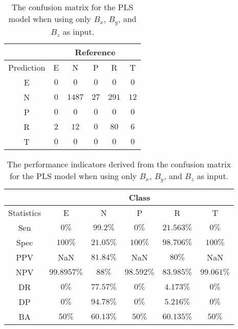 \begin{table}[!ht]
	\centering
	\begin{tabular}{|c|c|c|c|c|c|}
		\hline
		 & \multicolumn{5}{|c|}{Reference} \\ \hline
		 Prediction & E & N & P & R & T \\ \hline
		 E & $0$ & $0$ & $0$ & $0$ & $0$ \\ \hline
		 N & $0$ & $1487$ & $27$ & $291$ & $12$ \\ \hline
		 P & $0$ & $0$ & $0$ & $0$ & $0$ \\ \hline
		 R & $2$ & $12$ & $0$ & $80$ & $6$ \\ \hline
		 T & $0$ & $0$ & $0$ & $0$ & $0$ \\ \hline
	\end{tabular}
	\caption{The confusion matrix for the PLS model when using only $B_{x}$, $B_{y}$, and $B_{z}$ as input.}
	\label{tab:cm:coord:pls}
\end{table}

\begin{table}[!ht]
	\centering
	\begin{tabular}{|c|c|c|c|c|c|}
		\hline
		 & \multicolumn{5}{c|}{Class} \\ \hline
		Statistics & E & N & P & R & T \\ \hline
		Sen & $0\%$ & $99.2\%$ & $0\%$ & $21.563\%$ & $0\%$ \\ \hline
		Spec & $100\%$ & $21.05\%$ & $100\%$ & $98.706\%$ & $100\%$ \\ \hline
		PPV & NaN & $81.84\%$ & NaN & $80\%$ & NaN \\ \hline
		NPV & $99.8957\%$ & $88\%$ & $98.592\%$ & $83.985\%$ & $99.061\%$ \\ \hline
		DR & $0\%$ & $77.57\%$ & $0\%$ & $4.173\%$ & $0\%$ \\ \hline
		DP & $0\%$ & $94.78\%$ & $0\%$ & $5.216\%$ & $0\%$ \\ \hline
		BA & $50\%$ & $60.13\%$ & $50\%$ & $60.135\%$ & $50\%$ \\ \hline
	\end{tabular}
	\caption{The performance indicators derived from the confusion matrix for the PLS model when using only $B_{x}$, $B_{y}$, and $B_{z}$ as input.}
	\label{tab:cs:reverse:coord:pls}
\end{table}

